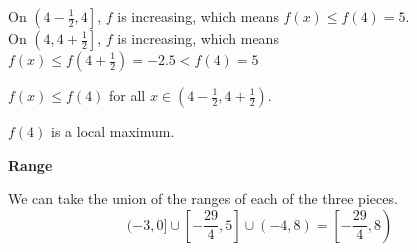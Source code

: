 \documentclass{ximera}
\begin{document}
\begin{exercise}
\begin{question}
On $\left( 4-\frac{1}{2}, 4 \right]$, $f$ is increasing, which means $f(x) \leq f(4) = 5$. \\

On $\left( 4, 4 + \frac{1}{2} \right]$, $f$ is increasing, which means $f(x) \leq f\left( 4 + \frac{1}{2} \right) = -2.5 < f(4) = 5$


$f(x) \leq f(4)$  for all $x \in \left( 4-\frac{1}{2}, 4 + \frac{1}{2} \right)$.

$f(4)$ is a local maximum.



\end{question}




\begin{question} \textbf{Range} 


We can take the union of the ranges of each of the three pieces.\\


\[
(-3, 0] \cup \left[ -\frac{29}{4}, 5 \right] \cup (-4, 8) = \left[ -\frac{29}{4}, 8 \right)
\]


\end{question}





\end{exercise}
\end{document}
